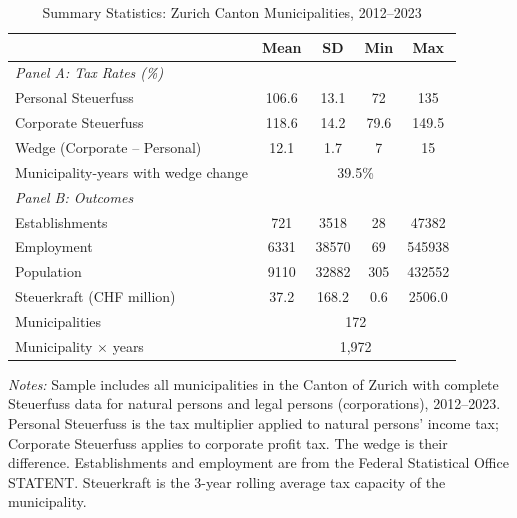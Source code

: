 \begin{table}[t]
\centering
\caption{Summary Statistics: Zurich Canton Municipalities, 2012--2023}
\label{tab:sumstats}
\begin{tabular}{lcccc}
\hline\hline
 & Mean & SD & Min & Max \\
\hline
\multicolumn{5}{l}{\textit{Panel A: Tax Rates (\%)}} \\
Personal Steuerfuss & 106.6 & 13.1 & 72 & 135 \\
Corporate Steuerfuss & 118.6 & 14.2 & 79.6 & 149.5 \\
Wedge (Corporate -- Personal) & 12.1 & 1.7 & 7 & 15 \\
Municipality-years with wedge change & \multicolumn{4}{c}{39.5\%} \\
\hline
\multicolumn{5}{l}{\textit{Panel B: Outcomes}} \\
Establishments & 721 & 3518 & 28 & 47382 \\
Employment & 6331 & 38570 & 69 & 545938 \\
Population & 9110 & 32882 & 305 & 432552 \\
Steuerkraft (CHF million) & 37.2 & 168.2 & 0.6 & 2506.0 \\
\hline
Municipalities & \multicolumn{4}{c}{172} \\
Municipality $\times$ years & \multicolumn{4}{c}{1,972} \\
\hline\hline
\end{tabular}
\begin{tablenotes}
\item \textit{Notes:} Sample includes all municipalities in the Canton of Zurich with complete Steuerfuss data for natural persons and legal persons (corporations), 2012--2023. Personal Steuerfuss is the tax multiplier applied to natural persons' income tax; Corporate Steuerfuss applies to corporate profit tax. The wedge is their difference. Establishments and employment are from the Federal Statistical Office STATENT. Steuerkraft is the 3-year rolling average tax capacity of the municipality.
\end{tablenotes}
\end{table}

